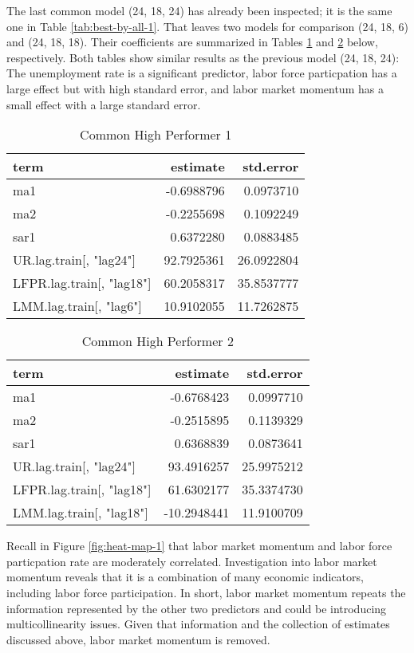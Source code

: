 \documentclass[12pt,letterpaper,toc=flat,oneside]{report}
\theoremstyle{definition}
\theoremstyle{definition}
\theoremstyle{definition}
\theoremstyle{remark}
\begin{document}
The last common model (24, 18, 24) has already been inspected; it is the
same one in Table \ref{tab:best-by-all-1}. That leaves two models for
comparison (24, 18, 6) and (24, 18, 18). Their coefficients are
summarized in Tables \ref{tab:common-1} and \ref{tab:common-2} below,
respectively. Both tables show similar results as the previous model
(24, 18, 24): The unemployment rate is a significant predictor, labor
force particpation has a large effect but with high standard error, and
labor market momentum has a small effect with a large standard error.

\begin{table}[!h]

\caption{\label{tab:common-1}Common High Performer 1}
\centering
\begin{tabular}[t]{lrr}
\toprule
\bfseries{term} & \bfseries{estimate} & \bfseries{std.error}\\
\midrule
ma1 & -0.6988796 & 0.0973710\\
ma2 & -0.2255698 & 0.1092249\\
sar1 & 0.6372280 & 0.0883485\\
UR.lag.train[, "lag24"] & 92.7925361 & 26.0922804\\
LFPR.lag.train[, "lag18"] & 60.2058317 & 35.8537777\\
LMM.lag.train[, "lag6"] & 10.9102055 & 11.7262875\\
\bottomrule
\end{tabular}
\end{table}

\begin{table}[!h]

\caption{\label{tab:common-2}Common High Performer 2}
\centering
\begin{tabular}[t]{lrr}
\toprule
\bfseries{term} & \bfseries{estimate} & \bfseries{std.error}\\
\midrule
ma1 & -0.6768423 & 0.0997710\\
ma2 & -0.2515895 & 0.1139329\\
sar1 & 0.6368839 & 0.0873641\\
UR.lag.train[, "lag24"] & 93.4916257 & 25.9975212\\
LFPR.lag.train[, "lag18"] & 61.6302177 & 35.3374730\\
LMM.lag.train[, "lag18"] & -10.2948441 & 11.9100709\\
\bottomrule
\end{tabular}
\end{table}

Recall in Figure \ref{fig:heat-map-1} that labor market momentum and
labor force particpation rate are moderately correlated. Investigation
into labor market momentum reveals that it is a combination of many
economic indicators, including labor force participation. In short,
labor market momentum repeats the information represented by the other
two predictors and could be introducing multicollinearity issues. Given
that information and the collection of estimates discussed above, labor
market momentum is removed.
\end{document}
